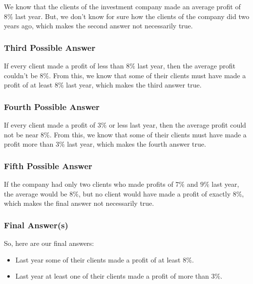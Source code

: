 We know that the clients of the investment company made an average
profit of $8 \%$ last year. But, we don't know for sure how the clients of
the company did two years ago, which makes the second answer not
necessarily true.


\subsubsection{Third Possible Answer}
\label{sub_sub_sec:third_possible_answer}

If every client made a profit of less than $8 \%$ last year, then the
average profit couldn't be $8 \%$. From this, we know that some of their
clients must have made a profit of at least $8 \%$ last year, which makes
the third answer true.


\subsubsection{Fourth Possible Answer}
\label{sub_sub_sec:fourth_possible_answer}

If every client made a profit of $3 \%$ or less last year, then the
average profit could not be near $8 \%$. From this, we know that some of
their clients must have made a profit more than $3 \%$ last year, which
makes the fourth answer true.


\subsubsection{Fifth Possible Answer}
\label{sub_sub_sec:fifth_possible_answer}

If the company had only two clients who made profits of $7 \%$ and $9
\%$ last year, the average would be $8 \%$, but no client would have made
a profit of exactly $8 \%$, which makes the final answer not necessarily
true.


\subsubsection{Final Answer(s)}
\label{sub_sub_sec:final_answer_s_}


So, here are our final answers:

\begin{itemize}
  \label{item:final_answers}

  \item Last year some of their clients made a profit of at least $8 \%$.
  \item Last year at least one of their clients made a profit of more than
    $3 \%$.
\end{itemize}


\newpage
